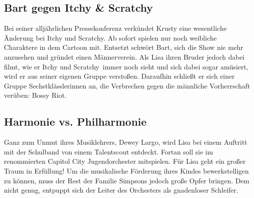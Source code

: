 
\subsection{Bart gegen Itchy \& Scratchy}
Bei seiner alljährlichen Pressekonferenz verkündet Krusty eine wesentliche Änderung bei \glqq Itchy und Scratchy\grqq. Ab sofort spielen nur noch weibliche Charaktere in dem Cartoon mit. Entsetzt schwört Bart, sich die Show nie mehr anzusehen und gründet einen Männerverein. Als Lisa ihren Bruder jedoch dabei filmt, wie er \glqq Itchy und Scratchy\grqq\ immer noch sieht und sich dabei sogar amüsiert, wird er aus seiner eigenen Gruppe verstoßen. Daraufhin schließt er sich einer Gruppe Sechstklässlerinnen an, die Verbrechen gegen die männliche Vorherrschaft verüben: Bossy Riot.


\subsection{Harmonie vs. Philharmonie}
Ganz zum Unmut ihres Musiklehrers, Dewey Largo, wird Lisa bei einem Auftritt mit der Schulband von einem Talentscout entdeckt. Fortan soll sie im renommierten Capitol City Jugendorchester mitspielen. Für Lisa geht ein großer Traum in Erfüllung! Um die musikalische Förderung ihres Kindes bewerkstelligen zu können, muss der Rest der Familie Simpsons jedoch große Opfer bringen. Dem nicht genug, entpuppt sich der Leiter des Orchesters als gnadenloser Schleifer.


